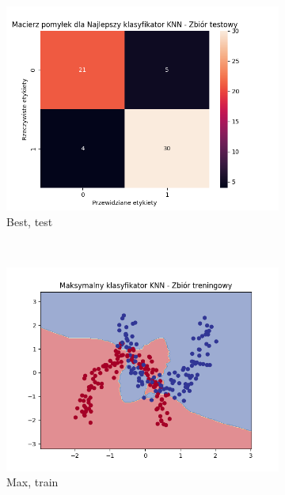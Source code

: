 \documentclass[12pt]{article}
\newcommand*{\subfigwidth}{0.24\textwidth}
\begin{document}
\begin{figure}[H]
\begin{subfigure}[t]{\subfigwidth}
        \includegraphics[width=\linewidth]{img/exp_2/knn/2_3/best/test_matrix.png}
        \caption{Best, test}
    \end{subfigure} 
    \\
    \begin{subfigure}[t]{\subfigwidth}
        \includegraphics[width=\linewidth]{img/exp_2/knn/2_3/max/train_boundary.png}
        \caption{Max, train}
    \end{subfigure}
    \hfill
    \begin{subfigure}[t]{\subfigwidth}

\end{subfigure}
\end{figure}
\end{document}
